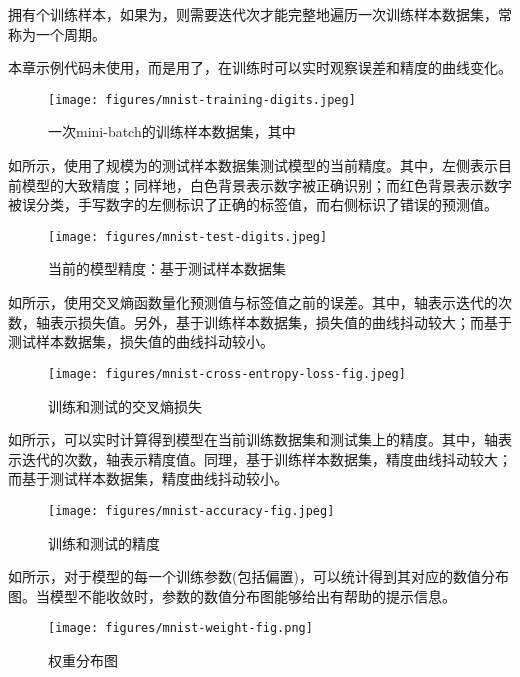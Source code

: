 \begin{content}
拥有个训练样本，如果为，则需要迭代次才能完整地遍历一次训练样本数据集，常称为一个周期。

\begin{remark}
本章示例代码未使用，而是用了，在训练时可以实时观察误差和精度的曲线变化。
\end{remark}

\begin{figure}[H]
\centering
\texttt{[image: figures/mnist-training-digits.jpeg]}
\caption{一次mini-batch的训练样本数据集，其中}
 \label{fig:mnist-training-digits}
\end{figure}

如所示，使用了规模为的测试样本数据集测试模型的当前精度。其中，左侧表示目前模型的大致精度；同样地，白色背景表示数字被正确识别；而红色背景表示数字被误分类，手写数字的左侧标识了正确的标签值，而右侧标识了错误的预测值。

\begin{figure}[H]
\centering
\texttt{[image: figures/mnist-test-digits.jpeg]}
\caption{当前的模型精度：基于测试样本数据集}
 \label{fig:mnist-test-digits}
\end{figure}

如所示，使用交叉熵函数量化预测值与标签值之前的误差。其中，轴表示迭代的次数，轴表示损失值。另外，基于训练样本数据集，损失值的曲线抖动较大；而基于测试样本数据集，损失值的曲线抖动较小。

\begin{figure}[H]
\centering
\texttt{[image: figures/mnist-cross-entropy-loss-fig.jpeg]}
\caption{训练和测试的交叉熵损失}
 \label{fig:mnist-cross-entropy-loss-fig}
\end{figure}

如所示，可以实时计算得到模型在当前训练数据集和测试集上的精度。其中，轴表示迭代的次数，轴表示精度值。同理，基于训练样本数据集，精度曲线抖动较大；而基于测试样本数据集，精度曲线抖动较小。

\begin{figure}[H]
\centering
\texttt{[image: figures/mnist-accuracy-fig.jpeg]}
\caption{训练和测试的精度}
 \label{fig:mnist-accuracy-fig}
\end{figure}

如所示，对于模型的每一个训练参数(包括偏置)，可以统计得到其对应的数值分布图。当模型不能收敛时，参数的数值分布图能够给出有帮助的提示信息。

\begin{figure}[H]
\centering
\texttt{[image: figures/mnist-weight-fig.png]}
\caption{权重分布图}
 \label{fig:mnist-weight-fig}
\end{figure}

\end{content}

